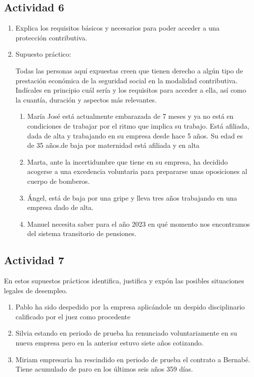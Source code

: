 \subsection{Actividad 6}
\begin{enumerate}[label=\alph*)]
    \item Explica los requisitos básicos y necesarios para poder acceder a una protección contributiva.
    \item Supuesto práctico:

    Todas las personas aquí expuestas creen que tienen derecho a algún tipo de prestación económica de la seguridad social en la modalidad contributiva. Indícales en principio cuál sería y los requisitos para acceder a ella, así como la cuantía, duración y aspectos más relevantes.

    \begin{enumerate}
        \item María José está actualmente embarazada de 7 meses y ya no está en condiciones de trabajar por el ritmo que implica su trabajo. Está  afiliada, dada de alta y trabajando en su empresa desde hace 5 años. Su edad es de 35 años.de baja por maternidad  está afiliada y en alta
        \item Marta, ante la incertidumbre que tiene en su empresa, ha decidido acogerse a una excedencia voluntaria para prepararse unas oposiciones al cuerpo de bomberos.
        \item Ángel, está de baja por una gripe y lleva tres años trabajando en una empresa dado de alta.
        \item Manuel necesita saber para el año 2023 en qué momento nos encontramos del sistema transitorio de pensiones.
    \end{enumerate}
\end{enumerate}

\subsection{Actividad 7}
En estos supuestos prácticos identifica, justifica y expón las posibles situaciones legales de desempleo.

\begin{enumerate}
    \item Pablo ha sido despedido por la empresa aplicándole un despido disciplinario calificado por el juez como procedente
    \item Silvia estando en periodo de prueba ha renunciado voluntariamente en su nueva empresa pero en la anterior estuvo siete años cotizando.
    \item Miriam empresaria ha rescindido  en periodo de prueba el contrato a Bernabé. Tiene acumulado de paro en los últimos seis años 359 días.
\end{enumerate}

